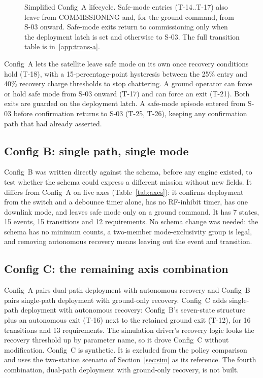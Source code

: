\documentclass[preprint,12pt]{elsarticle}
\newcommand{\cfgA}{Config~A}
\newcommand{\cfgB}{Config~B}
\newcommand{\cfgC}{Config~C}
\begin{document}
\begin{figure}[t]
{}
\caption{Simplified \cfgA{} lifecycle. Safe-mode entries (T-14..T-17) also leave from COMMISSIONING and, for the ground command, from S-03 onward. Safe-mode exits return to commissioning only when the deployment latch is set and otherwise to S-03. The full transition table is in~\ref{app:trans-a}.}
\label{fig:config-a}
\end{figure}

\cfgA{} lets the satellite leave safe mode on its own once recovery conditions hold (T-18), with a 15-percentage-point hysteresis between the 25\% entry and 40\% recovery charge thresholds to stop chattering. A ground operator can force or hold safe mode from S-03 onward (T-17) and can force an exit (T-21). Both exits are guarded on the deployment latch. A safe-mode episode entered from S-03 before confirmation returns to S-03 (T-25, T-26), keeping any confirmation path that had already asserted.

\subsection{Config B: single path, single mode}

\cfgB{} was written directly against the schema, before any engine existed, to test whether the schema could express a different mission without new fields. It differs from \cfgA{} on five axes (Table~\ref{tab:axes}): it confirms deployment from the switch and a debounce timer alone, has no RF-inhibit timer, has one downlink mode, and leaves safe mode only on a ground command. It has 7 states, 15 events, 15 transitions and 12 requirements. No schema change was needed: the schema has no minimum counts, a two-member mode-exclusivity group is legal, and removing autonomous recovery means leaving out the event and transition.

\subsection{Config C: the remaining axis combination}

\cfgA{} pairs dual-path deployment with autonomous recovery and \cfgB{} pairs single-path deployment with ground-only recovery. \cfgC{} adds single-path deployment with autonomous recovery: \cfgB{}'s seven-state structure plus an autonomous exit (T-16) next to the retained ground exit (T-12), for 16 transitions and 13 requirements. The simulation driver's recovery logic looks the recovery threshold up by parameter name, so it drove \cfgC{} without modification. \cfgC{} is synthetic. It is excluded from the policy comparison and uses the two-station scenario of Section~\ref{sec:sim} as its reference. The fourth combination, dual-path deployment with ground-only recovery, is not built.
\end{document}
